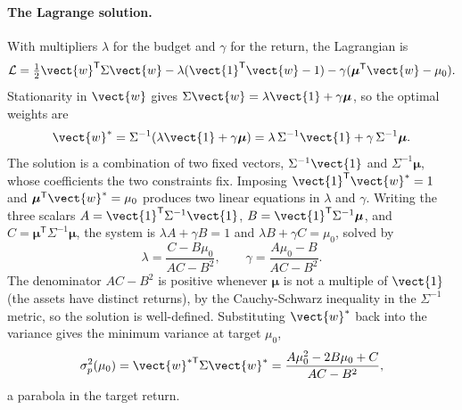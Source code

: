 \paragraph{The Lagrange solution.} With multipliers $\lambda$ for the
budget and $\gamma$ for the return, the Lagrangian is
\[
\mathcal{L} = \tfrac{1}{2}\vect{w}^{\mathsf{T}}\Sigma\vect{w}
- \lambda(\vect{1}^{\mathsf{T}}\vect{w} - 1)
- \gamma(\boldsymbol{\mu}^{\mathsf{T}}\vect{w} - \mu_{0}).
\]
Stationarity in $\vect{w}$ gives $\Sigma\vect{w} = \lambda\vect{1} +
\gamma\boldsymbol{\mu}$, so the optimal weights are
\[
\vect{w}^{*} = \Sigma^{-1}(\lambda\vect{1} + \gamma\boldsymbol{\mu})
= \lambda\,\Sigma^{-1}\vect{1} + \gamma\,\Sigma^{-1}\boldsymbol{\mu}.
\]
The solution is a combination of two fixed vectors, $\Sigma^{-1}
\vect{1}$ and $\Sigma^{-1}\boldsymbol{\mu}$, whose coefficients the
two constraints fix. Imposing $\vect{1}^{\mathsf{T}}\vect{w}^{*} = 1$
and $\boldsymbol{\mu}^{\mathsf{T}}\vect{w}^{*} = \mu_{0}$ produces two
linear equations in $\lambda$ and $\gamma$. Writing the three scalars
$A = \vect{1}^{\mathsf{T}}\Sigma^{-1}\vect{1}$, $B = \vect{1}^{
\mathsf{T}}\Sigma^{-1}\boldsymbol{\mu}$, and $C = \boldsymbol{\mu}^{
\mathsf{T}}\Sigma^{-1}\boldsymbol{\mu}$, the system is $\lambda A +
\gamma B = 1$ and $\lambda B + \gamma C = \mu_{0}$, solved by
\[
\lambda = \frac{C - B\mu_{0}}{AC - B^{2}}, \qquad
\gamma = \frac{A\mu_{0} - B}{AC - B^{2}}.
\]
The denominator $AC - B^{2}$ is positive whenever $\boldsymbol{\mu}$
is not a multiple of $\vect{1}$ (the assets have distinct returns), by
the Cauchy-Schwarz inequality in the $\Sigma^{-1}$ metric, so the
solution is well-defined. Substituting $\vect{w}^{*}$ back into the
variance gives the minimum variance at target $\mu_{0}$,
\[
\sigma_{p}^{2}(\mu_{0}) = \vect{w}^{*\mathsf{T}}\Sigma\vect{w}^{*}
= \frac{A\mu_{0}^{2} - 2 B\mu_{0} + C}{AC - B^{2}},
\]
a parabola in the target return.

